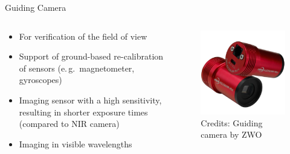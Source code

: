 \documentclass[11pt, aspectratio=169]{beamer}
\begin{document}
\begin{frame}{Guiding Camera}
\begin{columns}[t]
\begin{column}{0.6\textwidth}
\begin{itemize}
	\item For verification of the field of view
	\item Support of ground-based re-calibration of sensors (e.\,g.~magnetometer, gyroscopes)
	\item Imaging sensor with a high sensitivity, resulting in shorter exposure times (compared to NIR camera)
	\item Imaging in visible wavelengths
\end{itemize}
\end{column}
\begin{column}{0.4\textwidth}
	\begin{figure}[t]
		\centering
		\includegraphics[width=0.7\linewidth]{figures/images/ZWO_ASI290MM_Mini.jpg}
		\caption*{Credits: Guiding camera by ZWO}
		\label{fig::guiding_camera}
	\end{figure}
\end{column}
\end{columns}
\end{frame}

\end{document}
